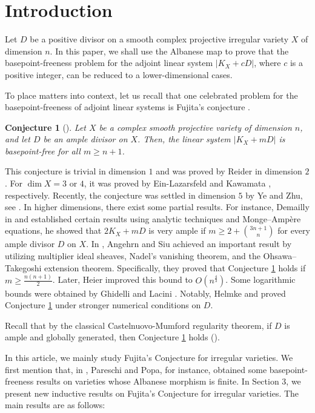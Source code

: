 \documentclass[sn-mathphys-num]{sn-jnl}%
\newtheorem{conjecture}[theorem]{Conjecture}
\theoremstyle{definition}
\numberwithin{equation}{section}
\begin{document}
\section{Introduction}
\par Let $D$ be a positive divisor on a smooth complex projective irregular variety $X$ of dimension $n$. In this paper, we shall use the Albanese map to prove that the basepoint-freeness problem  for the adjoint linear system $|K_{X} + cD|$, where $c$ is a positive integer, can be reduced to a lower-dimensional cases. 
\par To place matters into context, let us recall that one celebrated problem for the basepoint-freeness of adjoint linear systems is  Fujita's conjecture \cite{fujita}.
\begin{conjecture}[{\cite[Page 167]{fujita}}]\label{fujitaconjecture}
    Let $X$ be a complex smooth projective variety of dimension $n$, and let $D$ be an ample divisor on $X$. Then, the linear system $|K_{X} + mD|$ is basepoint-free for all $m \geq n+1$. 
\end{conjecture}
This conjecture is trivial in dimension $1$ and was proved by Reider \cite[Theorem 1]{reider} in dimension $2$. For $\dim X = 3$ or $4$, it was proved by Ein-Lazarsfeld \cite[Corollary 2*]{lazarsfeld} and Kawamata \cite[Theorem 4.1]{kawamatafujita}, respectively. Recently, the conjecture was settled in dimension $5$ by Ye and Zhu, see \cite[Page 3]{feizhu}. In higher dimensions, there exist some partial results. For instance, Demailly in \cite[Page 324]{demailly1} and \cite[Theorem 0.2]{demailly2} established certain results using analytic techniques and Monge–Ampère equations, he showed that $2K_{X} + mD$ is very ample if $m \geq 2 + \binom{3n+1}{n}$ for every ample divisor $D$ on $X$. In \cite[Corollary 0.2]{siu}, Angehrn and Siu achieved an important result by utilizing multiplier ideal sheaves, Nadel’s vanishing theorem, and the Ohsawa–Takegoshi extension theorem. Specifically, they proved that Conjecture \ref{fujitaconjecture} holds if $m \geq \frac{n(n+1)}{2}$. Later, Heier \cite[Theorem 1.4]{Heier} improved this bound to $O(n^{\frac{4}{3}})$. Some logarithmic bounds were obtained by Ghidelli and Lacini \cite[Theorem 1.1]{lacini}. Notably, Helmke \cite{helmke1} and \cite[Page 3]{helmke2} proved Conjecture \ref{fujitaconjecture} under stronger numerical conditions on $D$. 
\par Recall that by the classical Castelnuovo-Mumford regularity theorem, if $D$ is ample and globally generated, then Conjecture \ref{fujitaconjecture} holds (\cite[Example 1.8.23]{Lazabook}). \par In this article, we mainly study Fujita’s Conjecture for irregular varieties. We first mention that, in \cite[Section 5]{popapareschi1}, Pareschi and Popa, for instance, obtained some basepoint-freeness results on varieties whose Albanese morphism is finite. In Section 3, we present new inductive results on Fujita’s Conjecture for irregular varieties. The main results are as follows:
\end{document}
